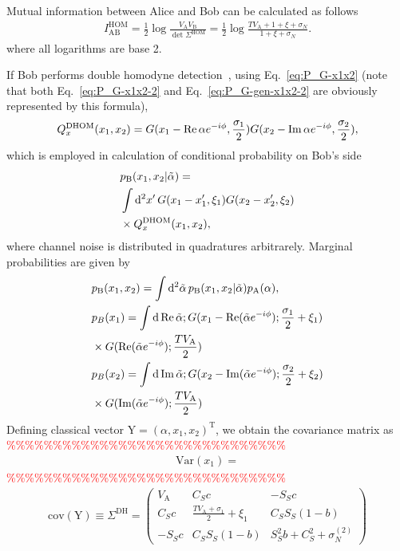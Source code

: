 \documentclass[%
reprint,
superscriptaddress,
 amsmath,amssymb,amsfonts,
 aps,
 pra,
 longbibliography
]{revtex4-2}
\renewcommand{\Re}{\mathop{\rm Re}\nolimits}
\renewcommand{\Im}{\mathop{\rm Im}\nolimits}
\newcommand{\ind}[1]{\mathrm{#1}}
\newcommand{\dd}{\mathrm{d}}
\begin{document}
Mutual information between Alice and Bob can be calculated as follows~\cite{SochEtAl2024_StatProofBook}
\begin{align}
\label{eq:IABPM}
    I_{\ind{AB}}^{\ind{HOM}}=\frac{1}{2}\log \frac{V_{\ind{A}}V_{\ind{B}}}
    {\det\Sigma^{\ind{HOM}}}=\frac{1}{2}\log \frac{TV_{\ind{A}}+1+\xi+\sigma_N}
    {1+\xi+\sigma_N}.
\end{align}
where all logarithms are base 2.

If Bob performs double homodyne 
detection~\cite{PhysRevLett.93.170504}, using Eq.~\eqref{eq:P_G-x1x2} (note that both Eq.~\eqref{eq:P_G-x1x2-2} and Eq.~\eqref{eq:P_G-gen-x1x2-2} are obviously represented by this formula),
\begin{align}
  Q_x^{\ind{DHOM}}(x_1,x_2)=G(x_1-\Re\alpha e^{-i\phi}, \frac{\sigma_1}{2})
  G(x_2-\Im\alpha e^{-i\phi}, \frac{\sigma_2}{2}),
\end{align}
which is employed in calculation of conditional probability on Bob's side
\begin{align}
  &p_{\ind{B}}(x_1,x_2|\tilde{\alpha})=\notag\\
  &\int\mathop{\dd^2 x'}
  G(x_1-x_1', \xi_1)G(x_2-x_2', \xi_2)\notag\\
  &\times Q_x^{\ind{DHOM}}(x_1,x_2),
\end{align}
where channel noise is distributed in quadratures arbitrarely. Marginal probabilities are given by
\begin{align}
  &p_{\ind{B}}(x_1,x_2)=\int\mathop{\dd^2\tilde \alpha}
  p_{\ind{B}}(x_1,x_2|\tilde{\alpha})p_{\ind{A}}(\alpha),\\
  &p_B(x_1) = \int \mathop{\dd \Re\tilde \alpha};
G(x_1 - \Re(\tilde{\alpha} e^{-i \phi}); \frac {\sigma_1}2 + \xi_1)
\notag\\&\times 
G(\Re(\tilde{\alpha} e^{-i \phi}); \frac{T V_{\ind{A}}}2 )
\\
  &p_B(x_2) = \int \mathop{\dd \Im\tilde \alpha};
G(x_2 - \Im(\tilde{\alpha} e^{-i \phi}); \frac {\sigma_2}2 + \xi_2)
\notag\\&\times 
G(\Im(\tilde{\alpha} e^{-i \phi}); \frac{T V_{\ind{A}}}2 )
\end{align}
Defining classical vector $\boldsymbol{\ind{Y}}=(\alpha,x_1,x_2)^{\ind{T}}$, we obtain the covariance matrix as
\textcolor{red}{\%\%\%\%\%\%\%\%\%\%\%\%\%\%\%\%\%\%\%\%\%\%\%\%\%\%\%\%\%\%}
\begin{align}
  \ind{Var}(x_1)=
\end{align}
\textcolor{red}{\%\%\%\%\%\%\%\%\%\%\%\%\%\%\%\%\%\%\%\%\%\%\%\%\%\%\%\%\%\%}
\begin{align}
  \ind{cov}(\boldsymbol{\ind{Y}})\equiv \Sigma^{\ind{DH}}=
  \begin{pmatrix}
        V_{\ind{A}}&C_Sc&-S_Sc\\
        C_Sc&\frac{TV_{\ind{A}}+\sigma_1}{2}+\xi_1&C_SS_S(1-b)\\
        -S_Sc&C_SS_S(1-b)&S_S^2b+C_S^2+\sigma_N^{(2)}
    \end{pmatrix}
\end{align}
\end{document}
